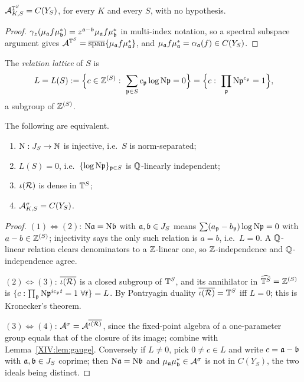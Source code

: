 \begin{lemma}\label{XIV:lem:gauge}
$\mathcal{A}_{K,S}^{\mathbb{T}^S}=C(Y_S)$, for every $K$ and every $S$, with no hypothesis.
\end{lemma}

\begin{proof}
$\gamma_z(\mu_{\mathfrak{a}} f\mu_{\mathfrak{b}}^*)=z^{\mathfrak{a}-\mathfrak{b}}\mu_{\mathfrak{a}} f\mu_{\mathfrak{b}}^*$ in multi-index notation, so a
spectral subspace argument gives $\mathcal{A}^{\mathbb{T}^S}=\overline{\operatorname{span}}\{\mu_{\mathfrak{a}} f\mu_{\mathfrak{a}}^*\}$, and
$\mu_{\mathfrak{a}} f\mu_{\mathfrak{a}}^*=\alpha_{\mathfrak{a}}(f)\in C(Y_S)$.
\end{proof}

\begin{definition}\label{XIV:def:L}
The \emph{relation lattice} of $S$ is
\[
L=L(S):=\Bigl\{c\in\Z^{(S)}:\ \sum_{\pp\in S}c_\pp\log\Ns\pp=0\Bigr\}
=\Bigl\{c:\ \prod_\pp\Ns\pp^{c_\pp}=1\Bigr\},
\]
a subgroup of $\mathbb{Z}^{(S)}$.
\end{definition}

\begin{theorem}[Equivalence]\label{XIV:thm:equiv}
The following are equivalent.
\begin{enumerate}
\item $\mathrm{N}:J_S\to\mathbb{N}$ is injective, i.e.\ $S$ is norm-separated;
\item $L(S)=0$, i.e.\ $\{\log\mathrm{N}\mathfrak{p}\}_{\mathfrak{p}\in S}$ is $\mathbb{Q}$-linearly independent;
\item $\iota(\mathcal{R})$ is dense in $\mathbb{T}^S$;
\item $\mathcal{A}_{K,S}^\sigma=C(Y_S)$.
\end{enumerate}
\end{theorem}

\begin{proof}
$(1)\Leftrightarrow(2)$: $\mathrm{N}\mathfrak{a}=\mathrm{N}\mathfrak{b}$ with $\mathfrak{a},\mathfrak{b}\in J_S$ means
$\sum(a_{\mathfrak{p}}-b_{\mathfrak{p}})\log\mathrm{N}\mathfrak{p}=0$ with $a-b\in\mathbb{Z}^{(S)}$; injectivity says the only such
relation is $a=b$, i.e.\ $L=0$. A $\mathbb{Q}$-linear relation clears denominators to a $\mathbb{Z}$-linear
one, so $\mathbb{Z}$-independence and $\mathbb{Q}$-independence agree.

$(2)\Leftrightarrow(3)$: $\overline{\iota(\mathcal{R})}$ is a closed subgroup of $\mathbb{T}^S$, and its
annihilator in $\widehat{\mathbb{T}^S}=\mathbb{Z}^{(S)}$ is $\{c:\prod_{\mathfrak{p}}\mathrm{N}\mathfrak{p}^{ic_{\mathfrak{p}} t}=1\ \forall t\}=L$.
By Pontryagin duality $\overline{\iota(\mathcal{R})}=\mathbb{T}^S$ iff $L=0$; this is Kronecker's theorem.

$(3)\Leftrightarrow(4)$: $\mathcal{A}^\sigma=\mathcal{A}^{\overline{\iota(\mathcal{R})}}$, since the fixed-point
algebra of a one-parameter group equals that of the closure of its image; combine with
Lemma~\ref{XIV:lem:gauge}. Conversely if $L\ne0$, pick $0\ne c\in L$ and write $c=\mathfrak{a}-\mathfrak{b}$ with
$\mathfrak{a},\mathfrak{b}\in J_S$ coprime; then $\mathrm{N}\mathfrak{a}=\mathrm{N}\mathfrak{b}$ and $\mu_{\mathfrak{a}}\mu_{\mathfrak{b}}^*\in\mathcal{A}^\sigma$ is not
in $C(Y_S)$, the two ideals being distinct.
\end{proof}

